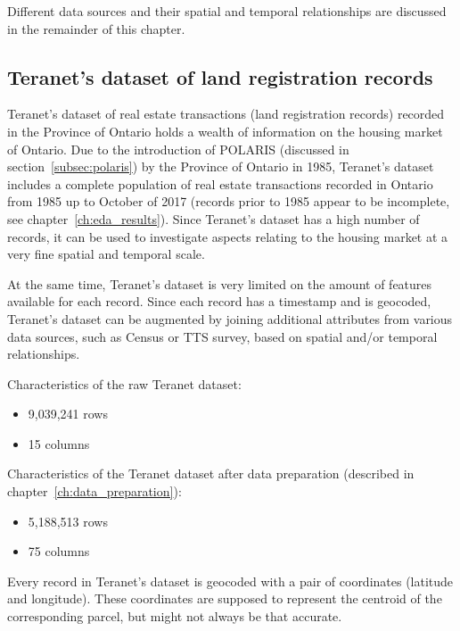 Different data sources and their spatial and temporal relationships are discussed in the remainder of this chapter.

\subsection{Teranet's dataset of land registration records} \label{subsec:teranet_description}

Teranet's dataset\cite{TeranetEnterprisesInc.2011} of real estate transactions (land registration records) recorded in the Province of Ontario holds a wealth of information on the housing market of Ontario.
Due to the introduction of POLARIS (discussed in section~\ref{subsec:polaris}) by the Province of Ontario in 1985, Teranet's dataset includes a complete population of real estate transactions recorded in Ontario from 1985 up to October of 2017 (records prior to 1985 appear to be incomplete, see chapter~\ref{ch:eda_results}).
Since Teranet's dataset has a high number of records, it can be used to investigate aspects relating to the housing market at a very fine spatial and temporal scale.

At the same time, Teranet's dataset is very limited on the amount of features available for each record.
Since each record has a timestamp and is geocoded, Teranet's dataset can be augmented by joining additional attributes from various data sources, such as Census or TTS survey, based on spatial and/or temporal relationships.

\vspace{5mm}

Characteristics of the raw Teranet dataset:
\begin{itemize}
    \item 9,039,241 rows
    \item 15 columns
\end{itemize}

Characteristics of the Teranet dataset after data preparation (described in chapter~\ref{ch:data_preparation}):
\begin{itemize}
    \item 5,188,513 rows
    \item 75 columns
\end{itemize}

Every record in Teranet's dataset is geocoded with a pair of coordinates (latitude and longitude).
These coordinates are supposed to represent the centroid of the corresponding parcel, but might not always be that accurate.

